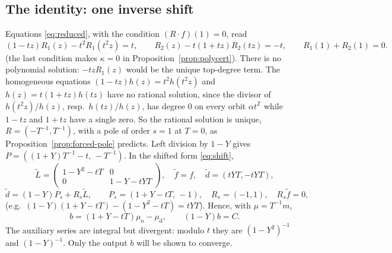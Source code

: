 \documentclass[11pt,a4paper]{article}
\newcommand{\Lt}{\widetilde L}
\newcommand{\dt}{\widetilde d}
\newcommand{\ft}{\widetilde f}
\theoremstyle{plain}
\theoremstyle{definition}
\theoremstyle{remark}
\begin{document}
\subsection{The identity: one inverse shift}
Equations \eqref{eq:reduced}, with the condition $(R\cdot f)(1)=0$, read
\[
  (1-tz)R_1(z)-t^2R_1(t^2z)=t,\qquad R_2(z)-t(1+tz)R_2(tz)=-t,\qquad R_1(1)+R_2(1)=0.
\]
(the last condition makes $\kappa=0$ in Proposition~\ref{prop:polycert}).
There is no polynomial solution: $-tzR_1(z)$
would be the unique top-degree term. The homogeneous equations
$(1-tz)h(z)=t^2h(t^2z)$ and $h(z)=t(1+tz)h(tz)$ have no rational solution, since
the divisor of $h(t^2z)/h(z)$, resp.\ $h(tz)/h(z)$, has degree $0$ on every orbit
$\alpha t^{\mathbb Z}$ while $1-tz$ and $1+tz$ have a single zero. So the rational
solution is unique, $R=(-T^{-1},T^{-1})$, with a pole of order $s=1$ at $T=0$, as
Proposition~\ref{prop:forced-pole} predicts. Left division by $1-Y$ gives
$P=((1+Y)T^{-1}-t,\,-T^{-1})$. In the shifted form \eqref{eq:shift},
\[
  \Lt=\begin{pmatrix}1-Y^2-tT&0\\0&1-Y-tYT\end{pmatrix},\quad \ft=f,\quad \dt=(tYT,-tYT),
\]
\begin{equation}\label{eq:euler-cert}
  \dt=(1-Y)P_s+R_s\Lt,\qquad P_s=(1+Y-tT,\,-1),\quad R_s=(-1,1),\quad R_s\ft=0,
\end{equation}
(e.g.\ $(1-Y)(1+Y-tT)-(1-Y^2-tT)=tYT$). Hence, with $\mu=T^{-1}m$,
\begin{equation}\label{eq:euler-b}
  b=(1+Y-tT)\mu_{\mathrm o}-\mu_{\mathrm d},\qquad (1-Y)b=C.
\end{equation}
The auxiliary series are integral but divergent: modulo $t$ they are
$(1-Y^2)^{-1}$ and $(1-Y)^{-1}$. Only the output $b$ will be shown to converge.
\end{document}
